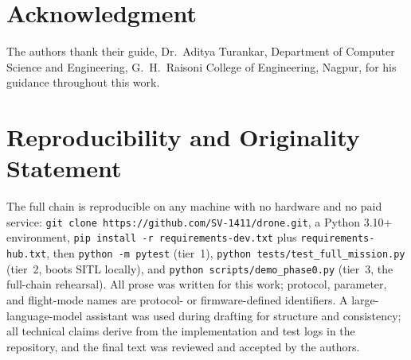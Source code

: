 \documentclass[conference]{IEEEtran}
\begin{document}
\section*{Acknowledgment}

The authors thank their guide, Dr.~Aditya Turankar, Department of
Computer Science and Engineering, G.~H.~Raisoni College of
Engineering, Nagpur, for his guidance throughout this work.

\section*{Reproducibility and Originality Statement}

The full chain is reproducible on any machine with no hardware and no
paid service: \texttt{git clone https://github.com/SV-1411/drone.git},
a Python 3.10+ environment, \texttt{pip install -r
requirements-dev.txt} plus \texttt{requirements-hub.txt}, then
\texttt{python -m pytest} (tier~1),
\texttt{python tests/test\_full\_mission.py} (tier~2, boots SITL
locally), and \texttt{python scripts/demo\_phase0.py} (tier~3, the
full-chain rehearsal). All prose was written for this work; protocol,
parameter, and flight-mode names are protocol- or firmware-defined
identifiers. A large-language-model assistant was used during drafting
for structure and consistency; all technical claims derive from the
implementation and test logs in the repository, and the final text was
reviewed and accepted by the authors.
\end{document}
